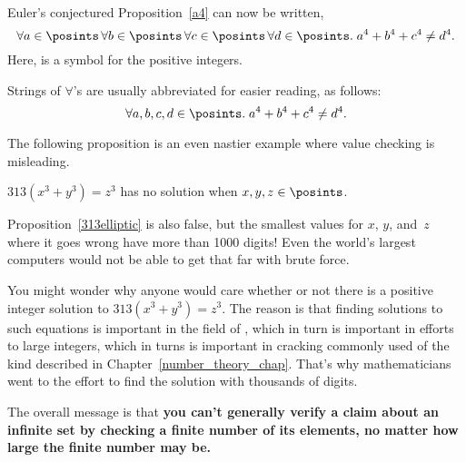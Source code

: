 \begin{editingnoes}
Euler's conjectured Proposition~\ref{a4} can now be written,
\[
\forall a \in \posints\, \forall b \in \posints\, \forall c \in
\posints\, \forall d \in \posints.\; a^4 + b^4 + c^4 \neq d^4.
\]
Here, \term{$\posints$} is a symbol for the positive integers.

Strings of $\forall$'s are usually abbreviated for easier reading, as
follows:
\[
\forall a, b, c, d \in \posints.\; a^4 + b^4 + c^4 \neq d^4.
\]

The following proposition is an even nastier example where value
checking is misleading.
\begin{proposition}\label{313elliptic}
$313 (x^3 + y^3) = z^3$ has no solution when $x, y, z\in\posints$.
\end{proposition}

Proposition~\ref{313elliptic} is also false, but the smallest values
for $x$, $y$, and~$z$ where it goes wrong have more than 1000 digits!
Even the world's largest computers would not be able to get that far
with brute force.

You might wonder why anyone would care whether or not there is a
positive integer solution to $313 (x^3 + y^3) = z^3$.  The reason is
that finding solutions to such equations is important in the field of
, which in turn is important in efforts to
 large integers, which in turns is important in cracking
commonly used  of the kind described in
Chapter~\ref{number_theory_chap}.  That's why mathematicians went to
the effort to find the solution with thousands of digits.

The overall message is that \textbf{you can't generally verify a claim
  about an infinite set by checking a finite number of its elements,
  no matter how large the finite number may be.}


\end{editingnoes}
